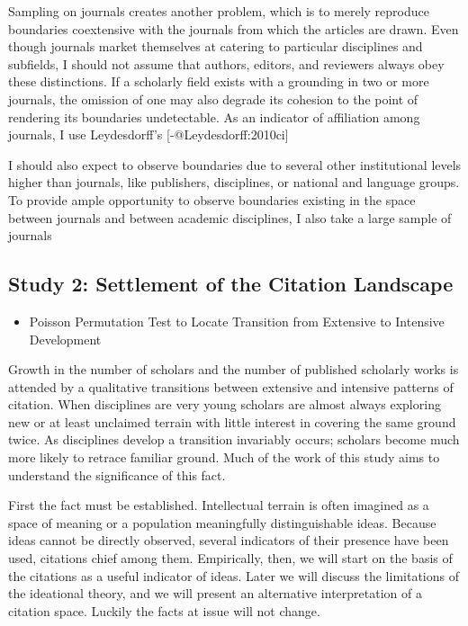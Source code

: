 \documentclass [PhD] {uclathes}
\providecommand{\tightlist}{
  \setlength{\itemsep}{0pt}\setlength{\parskip}{0pt}}
\begin{document}
Sampling on journals creates another problem, which is to merely
reproduce boundaries coextensive with the journals from which the
articles are drawn. Even though journals market themselves at catering
to particular disciplines and subfields, I should not assume that
authors, editors, and reviewers always obey these distinctions. If a
scholarly field exists with a grounding in two or more journals, the
omission of one may also degrade its cohesion to the point of rendering
its boundaries undetectable. As an indicator of affiliation among
journals, I use Leydesdorff's {[}-@Leydesdorff:2010ci{]}

I should also expect to observe boundaries due to several other
institutional levels higher than journals, like publishers, disciplines,
or national and language groups. To provide ample opportunity to observe
boundaries existing in the space between journals and between academic
disciplines, I also take a large sample of journals

\subsection{Study 2: Settlement of the Citation
Landscape}\label{study-2-settlement-of-the-citation-landscape}

\begin{itemize}
\tightlist
\item
  Poisson Permutation Test to Locate Transition from Extensive to
  Intensive Development
\end{itemize}

Growth in the number of scholars and the number of published scholarly
works is attended by a qualitative transitions between extensive and
intensive patterns of citation. When disciplines are very young scholars
are almost always exploring new or at least unclaimed terrain with
little interest in covering the same ground twice. As disciplines
develop a transition invariably occurs; scholars become much more likely
to retrace familiar ground. Much of the work of this study aims to
understand the significance of this fact.

First the fact must be established. Intellectual terrain is often
imagined as a space of meaning or a population meaningfully
distinguishable ideas. Because ideas cannot be directly observed,
several indicators of their presence have been used, citations chief
among them. Empirically, then, we will start on the basis of the
citations as a useful indicator of ideas. Later we will discuss the
limitations of the ideational theory, and we will present an alternative
interpretation of a citation space. Luckily the facts at issue will not
change.
\end{document}
